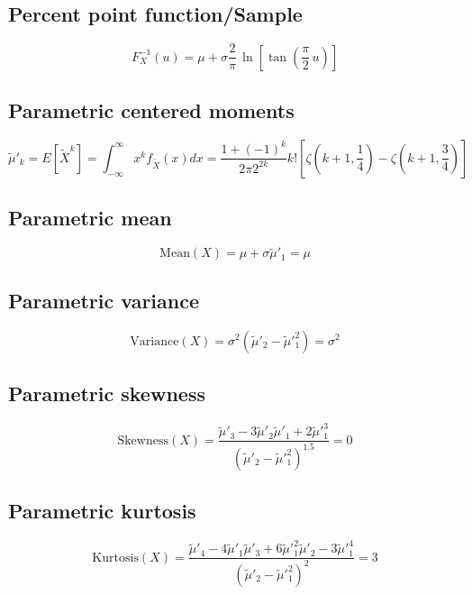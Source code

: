 \documentclass{article}
\begin{document}
\subsection{Percent point function/Sample}
\begin{equation*} F^{-1}_{X}\left(u\right)=\mu+\sigma\frac{2}{\pi}\,\ln\!\left[\tan\left(\frac{\pi}{2}\,u\right)\right] \end{equation*}
\subsection{Parametric centered moments}
\begin{equation*} \tilde{\mu}'_{k}=E[\tilde{X}^k]=\int_{-\infty}^{\infty}x^{k}f_{\tilde{X}}\left(x\right)dx=\frac{1+\left(-1\right)^{k}}{2\pi2^{2k}}k!\left[\zeta\left(k+1,\frac{1}{4}\right)-\zeta\left(k+1,\frac{3}{4}\right)\right] \end{equation*}
\subsection{Parametric mean}
\begin{equation*} \mathrm{Mean}(X)=\mu+\sigma\tilde{\mu}'_{1}=\mu \end{equation*}
\subsection{Parametric variance}
\begin{equation*} \mathrm{Variance}(X)=\sigma^{2}(\tilde{\mu}'_{2}-\tilde{\mu}'^{2}_{1})=\sigma^{2} \end{equation*}
\subsection{Parametric skewness}
\begin{equation*} \mathrm{Skewness}(X)=\frac{\tilde{\mu}'_{3}-3\tilde{\mu}'_{2}\tilde{\mu}'_{1}+2\tilde{\mu}'^{3}_{1}}{(\tilde{\mu}'_{2}-\tilde{\mu}'^{2}_{1})^{1.5}}=0 \end{equation*}
\subsection{Parametric kurtosis}
\begin{equation*} \mathrm{Kurtosis}(X)=\frac{\tilde{\mu}'_{4}-4\tilde{\mu}'_{1}\tilde{\mu}'_{3}+6\tilde{\mu}'^{2}_{1}\tilde{\mu}'_{2}-3\tilde{\mu}'^{4}_{1}}{(\tilde{\mu}'_{2}-\tilde{\mu}'^{2}_{1})^{2}}=3 \end{equation*}
\end{document}
